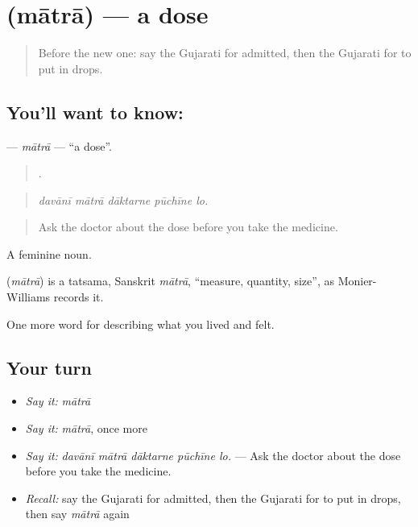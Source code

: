 \section[\texorpdfstring{\gu{માત્રા} (mātrā)}{માત્રા (mātrā)}]{ (mātrā) — a dose}

\label{lesson:GU-C485-matra}



\begin{quote}
Before the new one: say the Gujarati for admitted, then the Gujarati for to put in drops.
\end{quote}

\subsection*{You'll want to know: }
\textbf{} — \emph{mātrā} — \textquotedblleft{}a dose\textquotedblright{}.

\begin{quote}
    .
\end{quote}

\begin{quote}
\emph{davānī mātrā dāktarne pūchīne lo.}
\end{quote}

\begin{quote}
Ask the doctor about the dose before you take the medicine.
\end{quote}

A feminine noun.

\begin{cousinweb}
\textbf{} (\emph{mātrā}) is a tatsama, Sanskrit \emph{mātrā}, \textquotedblleft{}measure, quantity, size\textquotedblright{}, as Monier-Williams records it.
\end{cousinweb}

\begin{grammarlens}[title={What you've built}]
One more word for describing what you lived and felt.
\end{grammarlens}

\subsection*{Your turn}
\begin{itemize}
\raggedright
  \item \emph{Say it:} \emph{mātrā}
  \item \emph{Say it:} \emph{mātrā}, once more
  \item \emph{Say it:} \emph{davānī mātrā dāktarne pūchīne lo.} — Ask the doctor about the dose before you take the medicine.
  \item \emph{Recall:} say the Gujarati for admitted, then the Gujarati for to put in drops, then say \emph{mātrā} again
\end{itemize}

